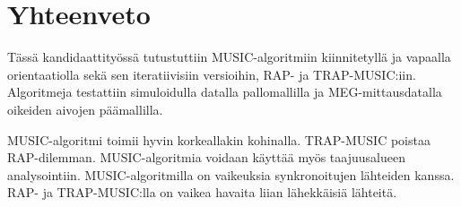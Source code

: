 \section{Yhteenveto}

Tässä kandidaattityössä tutustuttiin MUSIC-algoritmiin kiinnitetyllä ja vapaalla orientaatiolla sekä sen iteratiivisiin versioihin, RAP- ja TRAP-MUSIC:iin. Algoritmeja testattiin simuloidulla datalla pallomallilla ja MEG-mittausdatalla oikeiden aivojen päämallilla. 

MUSIC-algoritmi toimii hyvin korkeallakin kohinalla. TRAP-MUSIC poistaa RAP-dilemman. MUSIC-algoritmia voidaan käyttää myös taajuusalueen analysointiin. MUSIC-algoritmilla on vaikeuksia synkronoitujen lähteiden kanssa. RAP- ja TRAP-MUSIC:lla on vaikea havaita liian lähekkäisiä lähteitä. 